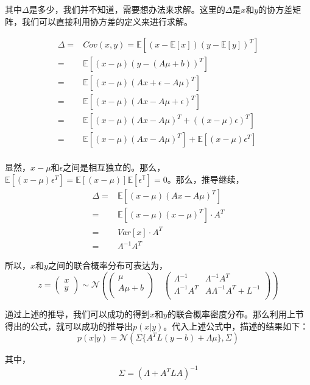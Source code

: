 \documentclass[a4paper]{article}
\begin{document}
其中$\Delta$是多少，我们并不知道，需要想办法来求解。这里的$\Delta$是$x$和$y$的协方差矩阵，我们可以直接利用协方差的定义来进行求解。

\begin{equation}
    \begin{split}
       \Delta = & Cov(x,y)= \mathbb{E}[(x-\mathbb{E}[x])(y-\mathbb{E}[y])^T]  \\
       = & \mathbb{E}[(x-\mu)(y-(A\mu + b))^T] \\
       = & \mathbb{E}[(x-\mu)(Ax+\epsilon-A\mu)^T] \\
       = & \mathbb{E}[(x-\mu)(Ax-A\mu+\epsilon)^T] \\
       = & \mathbb{E}[(x-\mu)(Ax-A\mu)^T+((x-\mu)\epsilon)^T] \\
       = & \mathbb{E}[(x-\mu)(Ax-A\mu)^T]+\mathbb{E}[(x-\mu)\epsilon^T] \\
  \end{split}
\end{equation}

显然，$x-\mu$和$\epsilon$之间是相互独立的。那么，$\mathbb{E}[(x-\mu)\epsilon^T]=\mathbb{E}[(x-\mu)]\mathbb{E[\epsilon^T]}=0$。那么，推导继续，
\begin{equation}
    \begin{split}
       \Delta
       = & \mathbb{E}[(x-\mu)(Ax-A\mu)^T] \\
       = & \mathbb{E}[(x-\mu)(x-\mu)^T]\cdot A^T \\
       = & Var[x]\cdot A^T \\
       = & \Lambda^{-1} A^T
  \end{split}
\end{equation}

所以，$x$和$y$之间的联合概率分布可表达为，
\begin{equation}
    z=
    \begin{pmatrix}
        x \\ 
        y
    \end{pmatrix} \sim
    \mathcal{N}
    \left(
    \begin{pmatrix}
        \mu \\
        A\mu + b \\
    \end{pmatrix}
    \quad
    \begin{pmatrix}
        \Lambda^{-1} & \Lambda^{-1} A^T \\
        \Lambda^{-1} A^T & A\Lambda^{-1}A^T +L^{-1} \\
    \end{pmatrix}
    \right)
\end{equation}

通过上述的推导，我们可以成功的得到$x$和$y$的联合概率密度分布。那么利用上节得出的公式，就可以成功的推导出$p(x|y)$。代入上述公式中，描述的结果如下：
\begin{equation}
    p(x|y)=\mathcal{N}(\Sigma\{ A^TL(y-b)+\Lambda\mu \}, \Sigma)
\end{equation}

其中，
\begin{equation}
    \Sigma = (\Lambda + A^TLA)^{-1}
\end{equation}
\end{document}
